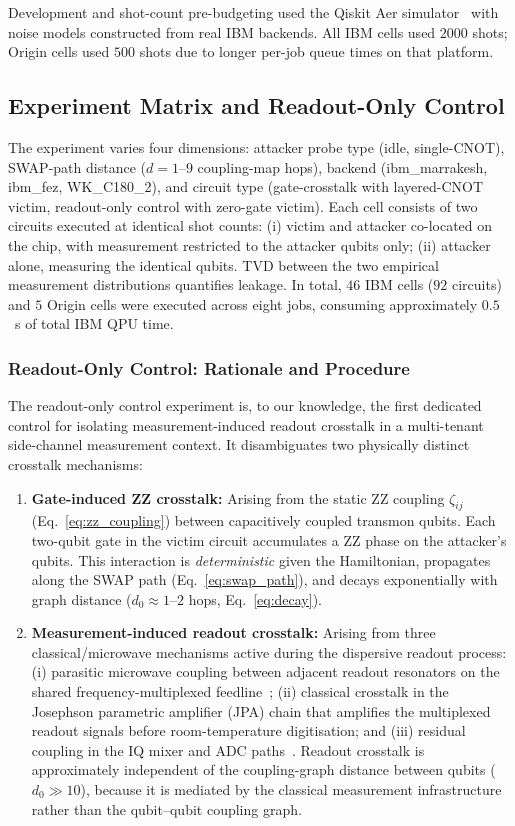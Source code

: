 \documentclass[ASNA,twocolumn]{USG}
\begin{document}
Development and shot-count pre-budgeting used the Qiskit Aer simulator~\cite{qiskit2026} with noise models constructed from real IBM backends. All IBM cells used $2000$ shots; Origin cells used $500$ shots due to longer per-job queue times on that platform.

\subsection{Experiment Matrix and Readout-Only Control}

The experiment varies four dimensions: attacker probe type (idle, single-CNOT), SWAP-path distance ($d = 1$--$9$ coupling-map hops), backend (ibm\_marrakesh, ibm\_fez, WK\_C180\_2), and circuit type (gate-crosstalk with layered-CNOT victim, readout-only control with zero-gate victim). Each cell consists of two circuits executed at identical shot counts: (i) victim and attacker co-located on the chip, with measurement restricted to the attacker qubits only; (ii) attacker alone, measuring the identical qubits. TVD between the two empirical measurement distributions quantifies leakage. In total, $46$ IBM cells ($92$ circuits) and $5$ Origin cells were executed across eight jobs, consuming approximately $0.5$~s of total IBM QPU time.

\subsubsection*{Readout-Only Control: Rationale and Procedure}

The readout-only control experiment is, to our knowledge, the first dedicated control for isolating measurement-induced readout crosstalk in a multi-tenant side-channel measurement context. It disambiguates two physically distinct crosstalk mechanisms:

\begin{enumerate}
    \item \textbf{Gate-induced ZZ crosstalk:} Arising from the static ZZ coupling $\zeta_{ij}$ (Eq.~\ref{eq:zz_coupling}) between capacitively coupled transmon qubits. Each two-qubit gate in the victim circuit accumulates a ZZ phase on the attacker's qubits. This interaction is \emph{deterministic} given the Hamiltonian, propagates along the SWAP path (Eq.~\ref{eq:swap_path}), and decays exponentially with graph distance ($d_0 \approx 1$--$2$ hops, Eq.~\ref{eq:decay}).
    \item \textbf{Measurement-induced readout crosstalk:} Arising from three classical/microwave mechanisms active during the dispersive readout process: (i) parasitic microwave coupling between adjacent readout resonators on the shared frequency-multiplexed feedline~\cite{mitigating2025measurement}; (ii) classical crosstalk in the Josephson parametric amplifier (JPA) chain that amplifies the multiplexed readout signals before room-temperature digitisation; and (iii) residual coupling in the IQ mixer and ADC paths~\cite{sank2016measurement,heimsoo2018rapid}. Readout crosstalk is approximately independent of the coupling-graph distance between qubits ($d_0 \gg 10$), because it is mediated by the classical measurement infrastructure rather than the qubit--qubit coupling graph.
\end{enumerate}
\end{document}
